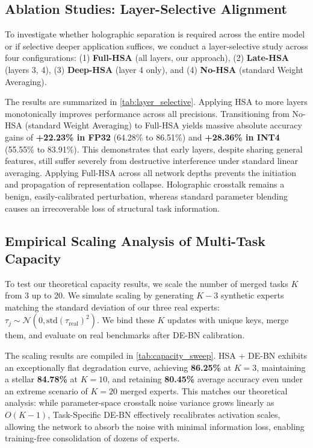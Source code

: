 \documentclass{article}
\theoremstyle{plain}
\theoremstyle{definition}
\theoremstyle{remark}
\begin{document}
\subsection{Ablation Studies: Layer-Selective Alignment}
To investigate whether holographic separation is required across the entire model or if selective deeper application suffices, we conduct a layer-selective study across four configurations: (1) \textbf{Full-HSA} (all layers, our approach), (2) \textbf{Late-HSA} (layers 3, 4), (3) \textbf{Deep-HSA} (layer 4 only), and (4) \textbf{No-HSA} (standard Weight Averaging).

The results are summarized in \cref{tab:layer_selective}. Applying HSA to more layers monotonically improves performance across all precisions. Transitioning from No-HSA (standard Weight Averaging) to Full-HSA yields massive absolute accuracy gains of \textbf{+22.23\% in FP32} (64.28\% to 86.51\%) and \textbf{+28.36\% in INT4} (55.55\% to 83.91\%). This demonstrates that early layers, despite sharing general features, still suffer severely from destructive interference under standard linear averaging. Applying Full-HSA across all network depths prevents the initiation and propagation of representation collapse. Holographic crosstalk remains a benign, easily-calibrated perturbation, whereas standard parameter blending causes an irrecoverable loss of structural task information.

\subsection{Empirical Scaling Analysis of Multi-Task Capacity}
\label{subsec:capacity_sweep}
To test our theoretical capacity results, we scale the number of merged tasks $K$ from 3 up to 20. We simulate scaling by generating $K-3$ synthetic experts matching the standard deviation of our three real experts: $\tau_j \sim \mathcal{N}(0, \text{std}(\tau_{\text{real}})^2)$. We bind these $K$ updates with unique keys, merge them, and evaluate on real benchmarks after DE-BN calibration.

The scaling results are compiled in \cref{tab:capacity_sweep}. HSA + DE-BN exhibits an exceptionally flat degradation curve, achieving \textbf{86.25\%} at $K=3$, maintaining a stellar \textbf{84.78\%} at $K=10$, and retaining \textbf{80.45\%} average accuracy even under an extreme scenario of $K=20$ merged experts. This matches our theoretical analysis: while parameter-space crosstalk noise variance grows linearly as $O(K-1)$, Task-Specific DE-BN effectively recalibrates activation scales, allowing the network to absorb the noise with minimal information loss, enabling training-free consolidation of dozens of experts.
\end{document}
